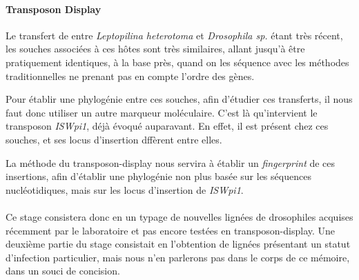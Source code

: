 \paragraph{Transposon Display\\} %
\label{par:transposon_display}
Le transfert de  entre \textit{Leptopilina heterotoma} et \textit{Drosophila sp.} étant très récent, les souches associées à ces hôtes sont très similaires, allant jusqu’à être pratiquement identiques, à la base près, quand on les séquence avec les méthodes traditionnelles ne prenant pas en compte l’ordre des gènes.

Pour établir une phylogénie entre ces souches, afin d’étudier ces transferts, il nous faut donc utiliser un autre marqueur moléculaire. C’est là qu’intervient le transposon \textit{ISWpi1}, déjà évoqué auparavant.
En effet, il est présent chez ces souches, et ses locus d’insertion dffèrent entre elles.

La méthode du transposon-display nous servira à établir un \textit{fingerprint} %
de ces insertions, afin d’établir une phylogénie non plus basée sur les séquences nucléotidiques, mais sur les locus d’insertion de \textit{ISWpi1}.

\paragraph{} %
\label{par:Sujet}
Ce stage consistera donc en un typage de nouvelles lignées de drosophiles acquises récemment par le laboratoire et pas encore testées en transposon-display. Une deuxième partie du stage consistait en l’obtention de lignées  présentant un statut d'infection particulier, mais nous n'en parlerons pas dans le corps de ce mémoire, dans un souci de concision.
